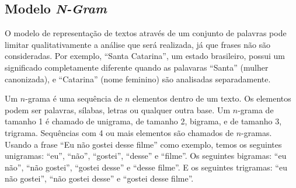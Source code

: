 \subsection{Modelo \textit{N-Gram}}

O modelo de representação de textos através de um conjunto de palavras pode limitar qualitativamente a análise que será realizada, já que frases não são consideradas. Por exemplo, ``Santa Catarina'', um estado brasileiro, possui um significado completamente diferente quando as palavaras ``Santa'' (mulher canonizada), e ``Catarina'' (nome feminino) são analisadas separadamente.

Um \(n\)-grama é uma sequência de \(n\) elementos dentro de um texto. Os elementos podem ser palavras, sílabas, letras ou qualquer outra base. Um \(n\)-grama de tamanho 1 é chamado de unigrama, de tamanho 2, bigrama, e de tamanho 3, trigrama. Sequências com 4 ou mais elementos são chamados de \(n\)-gramas. Usando a frase ``Eu não gostei desse filme'' como exemplo, temos os seguintes unigramas: ``eu'', ``não'', ``gostei'', ``desse'' e ``filme''. Os seguintes bigramas: ``eu não'', ``não gostei'', ``gostei desse'' e ``desse filme''. E os seguintes trigramas: ``eu não gostei'', ``não gostei desse'' e ``gostei desse filme''.
